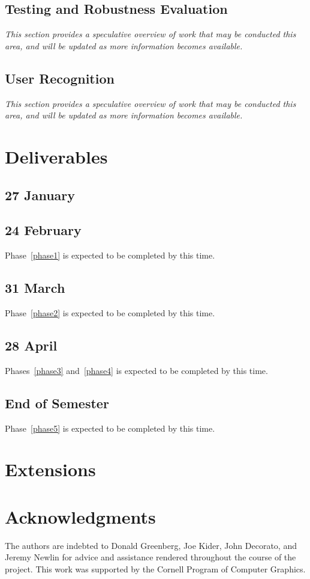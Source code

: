 \documentclass{scrartcl}
\begin{document}
    \subsection{Testing and Robustness Evaluation\label{phase5}}
    \emph{This section provides a speculative overview of work that may be conducted this area, and will be updated as more information becomes available.}
    \subsection{User Recognition\label{phase6}}
      \emph{This section provides a speculative overview of work that may be conducted this area, and will be updated as more information becomes available.}
  \section{Deliverables}
    \subsection{27 January}
    \subsection{24 February}
      Phase~\ref{phase1} is expected to be completed by this time.
    \subsection{31 March}
      Phase~\ref{phase2} is expected to be completed by this time.
    \subsection{28 April}
      Phases~\ref{phase3} and~\ref{phase4} is expected to be completed by this time.
    \subsection{End of Semester}
      Phase~\ref{phase5} is expected to be completed by this time. %
  \section{Extensions}
  \section{Acknowledgments}
    The authors are indebted to Donald Greenberg, Joe Kider, John Decorato, and Jeremy Newlin for advice and assistance rendered throughout the course of the project. This work was supported by the Cornell Program of Computer Graphics.
\end{document}
